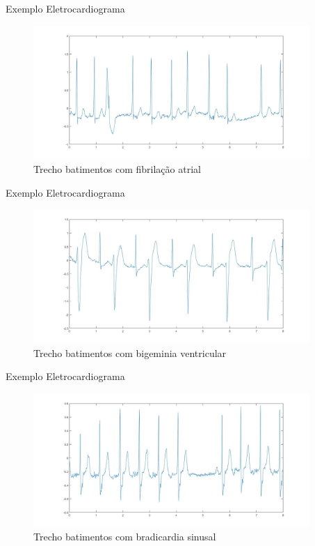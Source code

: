 \documentclass[10pt]{beamer}
\begin{document}
\begin{frame}{Exemplo Eletrocardiograma}
  \begin{figure}
    \includegraphics[width=10.5cm]{images/AtrialFibrilaionSample.jpg}
    \caption{Trecho batimentos com fibrilação atrial}
  \end{figure}
\end{frame}

\begin{frame}{Exemplo Eletrocardiograma}
  \begin{figure}
    \includegraphics[width=10.5cm]{images/BigeminySample.jpg}
    \caption{Trecho batimentos com bigeminia ventricular}
  \end{figure}
\end{frame}

\begin{frame}{Exemplo Eletrocardiograma}
  \begin{figure}
    \includegraphics[width=10.5cm]{images/SinusBradicardiaSample.jpg}
    \caption{Trecho batimentos com bradicardia sinusal}
  \end{figure}
\end{frame}
\end{document}
